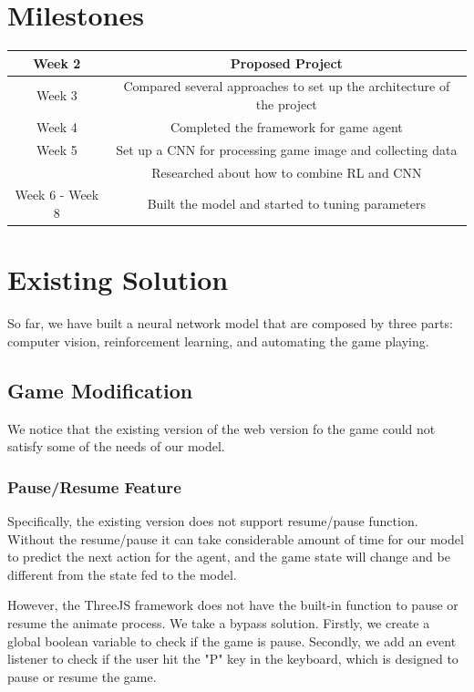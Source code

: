 \documentclass{article}
\begin{document}
\section{Milestones}
\begin{center}
\begin{tabular}{ | c | c |} 
\hline
Week 2 & Proposed Project \\ 
\hline
Week 3 & Compared several approaches to set up the architecture of the project\\ 
\hline
Week 4 & Completed the framework for game agent\\ 
\hline
Week 5 & Set up a CNN for processing game image and collecting data\\ & Researched about how to combine RL and CNN \\ 
\hline
Week 6 - Week 8 & Built the model and started to tuning parameters \\ 
\hline
\end{tabular}
\end{center}

\section{Existing Solution}
So far, we have built a neural network model that are composed by three parts: computer vision, reinforcement learning, and automating the game playing. 

\subsection{Game Modification}
We notice that the existing version of the web version fo the game could not satisfy some of the needs of our model. 

\subsubsection{Pause/Resume Feature}
Specifically, the existing version does not support resume/pause function. Without the resume/pause  it can take considerable amount of time for our model to predict the next action for the agent, and the game state will change and be different from the state fed to the model. \par 

However, the ThreeJS framework does not have the built-in function to pause or resume the animate process. We take a bypass solution. Firstly, we create a global boolean variable to check if the game is pause. Secondly, we add an event listener to check if the user hit the "P" key in the keyboard, which is designed to pause or resume the game.
\end{document}

